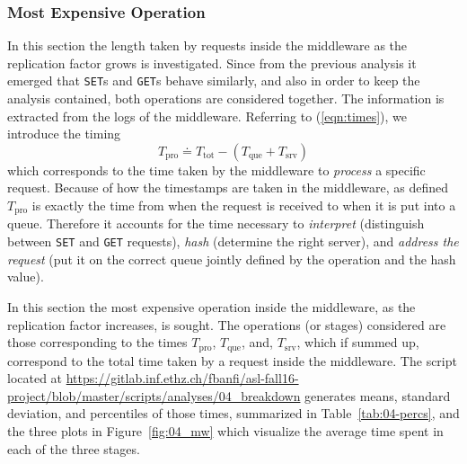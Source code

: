 \documentclass[11pt]{article}
\theoremstyle{definition}
\newcommand\Ttot{T_{\mathrm{tot}}}
\newcommand\Tque{T_{\mathrm{que}}}
\newcommand\Tsrv{T_{\mathrm{srv}}}
\newcommand\Tpro{T_{\mathrm{pro}}}
\renewcommand\t\texttt
\begin{document}
\subsubsection{Most Expensive Operation}

In this section the length taken by %
requests
inside the middleware as the replication factor grows is investigated.
Since from the previous analysis it emerged that \t{SET}s and \t{GET}s behave similarly, and also in order to keep the analysis contained, both operations are considered together.
The information is extracted from the logs of the middleware.
Referring to (\ref{eqn:times}), we introduce the timing
\[\Tpro\doteq\Ttot-(\Tque+\Tsrv)\]
which corresponds to the time taken by the middleware to \emph{process} a specific request.
Because of how the timestamps are taken in the middleware, as defined $\Tpro$ is exactly the time from when the request is received to when it is put into a queue.
Therefore it accounts for the time necessary to \emph{interpret} (distinguish between \t{SET} and \t{GET} requests), \emph{hash} (determine the right server), and \emph{address the request} (put it on the correct queue jointly defined by the operation and the hash value).

In this section the most expensive operation inside the middleware, as the replication factor increases, is sought.
The operations (or stages) considered are those corresponding to the times
$\Tpro$, $\Tque$, and, $\Tsrv$,
which if summed up, correspond to the total time taken by a request inside the middleware.
The script located at \url{https://gitlab.inf.ethz.ch/fbanfi/asl-fall16-project/blob/master/scripts/analyses/04_breakdown} generates means, standard deviation, and percentiles of those times, summarized in Table~\ref{tab:04-percs}, and the three plots in Figure~\ref{fig:04_mw} which visualize the average time spent in each of the three stages.

\end{document}
